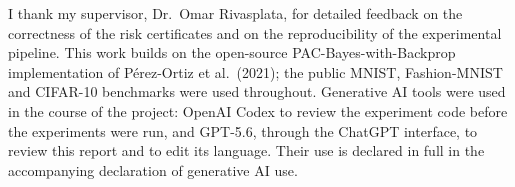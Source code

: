 \begin{uomacknowledgements}
I thank my supervisor, Dr.\ Omar Rivasplata, for detailed feedback on the
correctness of the risk certificates and on the reproducibility of the
experimental pipeline. This work
builds on the open-source PAC-Bayes-with-Backprop implementation of
P\'erez-Ortiz et al.\ (2021); the public MNIST, Fashion-MNIST and CIFAR-10
benchmarks were used throughout. Generative AI tools were used in the course
of the project: OpenAI Codex to review the experiment code before the
experiments were run, and GPT-5.6, through the ChatGPT interface, to review
this report and to edit its language. Their use is declared in full in the
accompanying declaration of generative AI use.
\end{uomacknowledgements}



\uomstartmainbody



\printbibliography[title={References},heading=bibintoc] %




